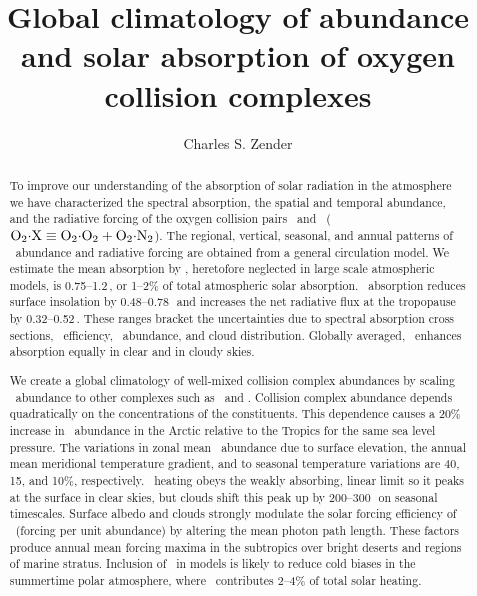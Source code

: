 \documentclass[agupp,twoside]{aguplus} %
\begin{document}
\def\paperchaptertitle{Global climatology of abundance and solar
absorption of oxygen collision complexes} 
\title{\paperchaptertitle}

\author{Charles S. Zender}

\begin{abstract}
To improve our understanding of the absorption of solar radiation in 
the atmosphere we have characterized the spectral absorption, the
spatial and temporal abundance, and the radiative forcing of the
oxygen collision pairs \OdOd\ and \OdNd\ ($\OdX \equiv \OdOd +
\OdNd$). 
The regional, vertical, seasonal, and annual patterns of \OdX\
abundance and radiative forcing are obtained from a general
circulation model. 
We estimate the mean absorption by \OdX, heretofore neglected in large
scale atmospheric models, is 0.75--1.2\,\wxmS, or 1--2\% of total
atmospheric solar absorption.   
\OdX\ absorption reduces surface insolation by 0.48--0.78\,\wxmS\ and  
increases the net radiative flux at the tropopause by
0.32--0.52\,\wxmS.   
These ranges bracket the uncertainties due to spectral absorption
cross sections, \OdNd\ efficiency, \OdX\ abundance, and cloud
distribution. 
Globally averaged, \OdX\ enhances absorption equally in clear and
in cloudy skies.

We create a global climatology of well-mixed collision complex
abundances by scaling \OdX\ abundance to other complexes such as
\NdNd\ and \OdAr.  
Collision complex abundance depends quadratically on the
concentrations of the constituents.  
This dependence causes a 20\% increase in \OdX\ abundance in the 
Arctic relative to the Tropics for the same sea level pressure.  
The variations in zonal mean \OdX\ abundance due to surface elevation,
the annual mean meridional temperature gradient, and to seasonal
temperature variations are 40, 15, and 10\%, respectively.    
\OdX\ heating obeys the weakly absorbing, linear limit so it peaks at
the surface in clear skies, but clouds shift this peak up by
200--300\,\mb\ on seasonal timescales. 
Surface albedo and clouds strongly modulate the solar forcing
efficiency of \OdX\ (forcing per unit abundance) by altering the mean
photon path length. 
These factors produce annual mean forcing maxima in the subtropics
over bright deserts and regions of marine stratus.    
Inclusion of \OdX\ in models is likely to reduce cold biases in the
summertime polar atmosphere, where \OdX\ contributes 2--4\% of total
solar heating. 


\end{abstract}
\end{document}
